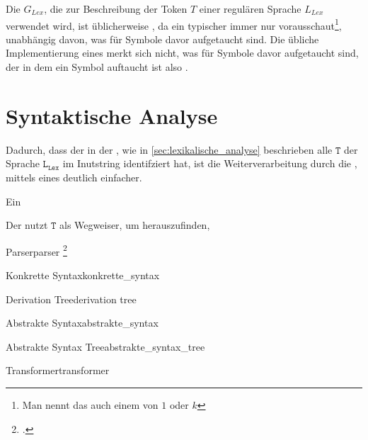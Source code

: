 \begin{special_paragraph}
  Die  $G_{Lex}$, die zur Beschreibung der Token $T$ einer regulären Sprache $L_{Lex}$ verwendet wird, ist üblicherweise , da ein typischer  immer nur  vorausschaut\footnote{Man nennt das auch einem  von $1$ oder $k$}, unabhängig davon, was für Symbole davor aufgetaucht sind. Die übliche Implementierung eines  merkt sich nicht, was für Symbole davor aufgetaucht sind, der  in dem ein Symbol auftaucht ist also .
\end{special_paragraph}

\section{Syntaktische Analyse}
Dadurch, dass der  in der , wie in \ref{sec:lexikalische_analyse} beschrieben alle  $\mathtt{T}$ der Sprache $\mathtt{L_{Lex}}$ im Inutstring identifziert hat, ist die Weiterverarbeitung durch die , mittels eines  deutlich einfacher.

Ein

Der  nutzt  $\mathtt{T}$ als Wegweiser, um herauszufinden,


\begin{Definition}{Parser}{parser}
\footcite{noauthor_what_nodate}
\end{Definition}

\begin{Definition}{Konkrette Syntax}{konkrette_syntax}
\end{Definition}

\begin{Definition}{Derivation Tree}{derivation tree}
\end{Definition}

\begin{Definition}{Abstrakte Syntax}{abstrakte_syntax}
\end{Definition}

\begin{Definition}{Abstrakte Syntax Tree}{abstrakte_syntax_tree}
\end{Definition}

\begin{Definition}{Transformer}{transformer}
\end{Definition}

